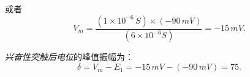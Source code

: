 或者
\begin{equation}\label{eq:12_substituting_V_m_2}
	V_m = 
	\frac{
		(1 \times 10^{-6} \, \textit{S})
		\times
		(-90 \, \textit{mV})
	}{
		(6 \times 10^{-6} \textit{S})
	}
	= -15 \, \textit{mV}.
\end{equation}


\textit{兴奋性突触后电位}的峰值振幅为：
\begin{equation}\label{peak_amplitude}
	\delta = V_m - E_1 = -15 \, \textit{mV} - (-90 \, \textit{mV}) = 75.
\end{equation}


